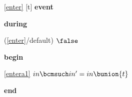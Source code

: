 \noindent \ref{enter} [t] \textbf{event}
\begin{block}
  \item   \textbf{during}
  \begin{block}
  \item[ (\ref{enter}/default) ]{$\false $} %
  \end{block}
  \item   \textbf{begin}
  \begin{block}
  \item[ \eqref{entera1} ]{$in \bcmsuch in' = in \bunion \{ t \} $} %
  \end{block}
  \item   \textbf{end} \\
\end{block}
